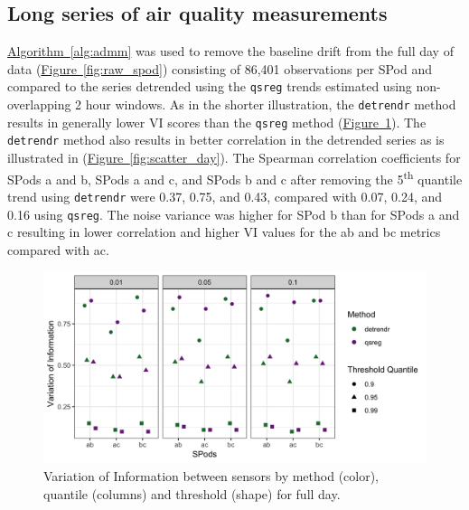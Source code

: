 \documentclass[aoas]{imsart}
\newcommand{\Fig}[1]{\hyperref[fig:#1]{Figure~\ref*{fig:#1}}} %
\newcommand{\Alg}[1]{\hyperref[alg:#1]{Algorithm~\ref*{alg:#1}}} %
\newcommand{\Fig}[1]{{Figure~\ref{fig:#1}}} %
\newcommand{\Alg}[1]{{Algorithm~\ref{alg:#1}}} %
\begin{document}
\subsection{Long series of air quality measurements}
\label{sec:long-app}
\Alg{admm} was used to remove the baseline drift from the full day of data  (\Fig{raw_spod}) consisting of 86,401 observations per SPod and compared to the series detrended using the \texttt{qsreg} trends estimated using non-overlapping 2 hour windows. As in the shorter illustration, the \texttt{detrendr} method results in generally lower VI scores than the \texttt{qsreg} method (\Fig{vi_day}). The \texttt{detrendr} method also results in better correlation in the detrended series as is illustrated in (\Fig{scatter_day}). The Spearman correlation coefficients for SPods a and b, SPods a and c, and SPods b and c after removing the 5\textsuperscript{th} quantile trend using \texttt{detrendr} were 0.37, 0.75, and 0.43, compared with 0.07, 0.24, and 0.16 using \texttt{qsreg}. The noise variance was higher for SPod b than for SPods a and c resulting in lower correlation and higher VI values for the ab and bc metrics compared with ac. 

\begin{figure}
	\centering
	\includegraphics[width = 1\linewidth]{Figures/VI_app_long.png}
	\caption{Variation of Information between sensors by method (color), quantile (columns) and threshold (shape) for full day.}
	\label{fig:vi_day}
\end{figure}
\end{document}

